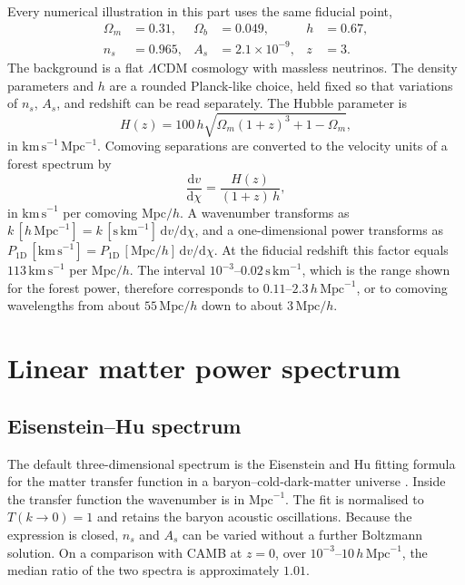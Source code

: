 \documentclass[11pt]{article}
\begin{document}
Every numerical illustration in this part uses the same fiducial point,
\begin{equation}
\label{eq:fiducial}
\begin{aligned}
\Omega_m &= 0.31, &
\Omega_b &= 0.049, &
h &= 0.67, \\
n_s &= 0.965, &
A_s &= 2.1\times 10^{-9}, &
z &= 3.
\end{aligned}
\end{equation}
The background is a flat $\Lambda$CDM cosmology with massless neutrinos.
The density parameters and $h$ are a rounded Planck-like choice, held fixed so that variations of $n_s$, $A_s$, and redshift can be read separately.
The Hubble parameter is
\begin{equation}
\label{eq:hubble}
H(z) = 100\,h \sqrt{\Omega_m(1+z)^{3} + 1 - \Omega_m},
\end{equation}
in $\mathrm{km\,s}^{-1}\,\mathrm{Mpc}^{-1}$.
Comoving separations are converted to the velocity units of a forest spectrum by
\begin{equation}
\label{eq:units}
\frac{\mathrm{d}v}{\mathrm{d}\chi}
=
\frac{H(z)}{(1+z)\,h},
\end{equation}
in $\mathrm{km\,s}^{-1}$ per comoving $\mathrm{Mpc}/h$.
A wavenumber transforms as $k\,[h\,\mathrm{Mpc}^{-1}] = k\,[\mathrm{s\,km}^{-1}]\,\mathrm{d}v/\mathrm{d}\chi$, and a one-dimensional power transforms as $P_{1\mathrm{D}}\,[\mathrm{km\,s}^{-1}] = P_{1\mathrm{D}}\,[\mathrm{Mpc}/h]\,\mathrm{d}v/\mathrm{d}\chi$.
At the fiducial redshift this factor equals $113\,\mathrm{km\,s}^{-1}$ per $\mathrm{Mpc}/h$.
The interval $10^{-3}$--$0.02\,\mathrm{s\,km}^{-1}$, which is the range shown for the forest power, therefore corresponds to $0.11$--$2.3\,h\,\mathrm{Mpc}^{-1}$, or to comoving wavelengths from about $55\,\mathrm{Mpc}/h$ down to about $3\,\mathrm{Mpc}/h$.

\section{Linear matter power spectrum}
\label{sec:matter}

\subsection{Eisenstein--Hu spectrum}
\label{sec:eh}

The default three-dimensional spectrum is the Eisenstein and Hu fitting formula for the matter transfer function in a baryon--cold-dark-matter universe \citep{Eisenstein:1997ik}.
Inside the transfer function the wavenumber is in $\mathrm{Mpc}^{-1}$.
The fit is normalised to $T(k\to 0)=1$ and retains the baryon acoustic oscillations.
Because the expression is closed, $n_s$ and $A_s$ can be varied without a further Boltzmann solution.
On a comparison with CAMB at $z=0$, over $10^{-3}$--$10\,h\,\mathrm{Mpc}^{-1}$, the median ratio of the two spectra is approximately $1.01$.
\end{document}
